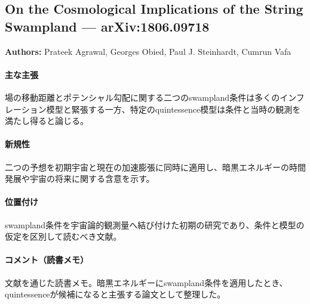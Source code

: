 \subsection{On the Cosmological Implications of the String Swampland --- arXiv:1806.09718}

\textbf{Authors:} Prateek Agrawal, Georges Obied, Paul J. Steinhardt, Cumrun Vafa

\paragraph{主な主張}
場の移動距離とポテンシャル勾配に関する二つのswampland条件は多くのインフレーション模型と緊張する一方、特定のquintessence模型は条件と当時の観測を満たし得ると論じる\cite{Agrawal:2018own}。

\paragraph{新規性}
二つの予想を初期宇宙と現在の加速膨張に同時に適用し、暗黒エネルギーの時間発展や宇宙の将来に関する含意を示す。

\paragraph{位置付け}
swampland条件を宇宙論的観測量へ結び付けた初期の研究であり、条件と模型の仮定を区別して読むべき文献。

\paragraph{コメント（読書メモ）}
文献\cite{Akrami:2018ylq}を通じた読書メモ。暗黒エネルギーにswampland条件を適用したとき、quintessenceが候補になると主張する論文として整理した。
